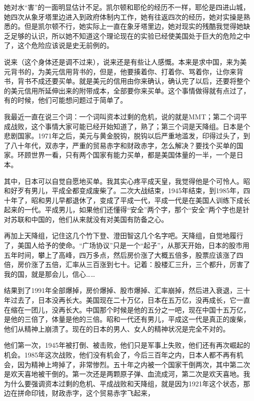 \documentclass[UTF8, 12pt, a4paper]{ctexrep}
\begin{document}
她对水“害”的一面明显估计不足。凯尔顿和耶伦的经历不一样，耶伦是四进山城，她四次从象牙塔里边进入到政府体制内工作，她有往返四次的经历，她对实操是熟悉的。但是凯尔顿不行，她实际上一直在象牙塔里边，她对现实的残酷我觉得她缺乏足够的认识，所以她不知道这个理论现在的实验已经使美国处于巨大的危险之中了，这个危险应该说是史无前例的。

说来（这个身体还是调不过来），说来还是有些让人感慨。本来是求中国，来为美元背书的，为美元信用背书的，但是，他要揍着你、打着你、骂着你，让你来背书，背书不成还要买单。就是美元的信用由你来确认，确认完了以后，还要将整个的美元信用所延伸出来的附带成本，全部要你来买单。这个事情做得就有点过了，有的时候，他们可能想问题过于简单了。

我最近一直在说三个词：一个词叫资本过剩的危机，说的就是MMT；第二个词平成战败，这个事情大家可能已经开始知道了，熟了；第三个词是天降组。日本是个悲剧国家。1971年之后，美元与黄金脱钩，脱钩以后严重地滥发，印得过头了，到了八十年代，双赤字，严重的贸易赤字和财政赤字，怎么解决？要找个买单的国家。环顾世界一看，只有两个国家有能力买单，都是美国体量的一半，一个是日本。

其中，日本可以自觉自愿地买单。我其实心疼平成天皇，我觉得他是个可怜人。昭和好歹有男儿，平成全都变成废柴了。二次大战结束，1945年结束，到1985年，四十年了，昭和男儿早都退休了，变成了平成一代，平成一代是在美国人训练下成长起来的一代。平成男儿，如果他们还懂得“安全”两个字，那个“安全”两个字也是针对苏联和中国的，他们从来就没有对美国有防备之心。

再加上天降组，记住这几个竹下登、澄田智这几个名字吧。天降组，自觉地履行了，美国人给予的使命。“广场协议”只是一个“起子”，从那天开始，日本的股市用五年时间，攀上了高峰，四万多点，然后房价涨了大概五倍多，股票应该涨了四倍，房价涨了五倍，汇率从三百涨到七十。记着：股楼汇三升，三个都升，厉害了我的国，就是那会儿，信心……

结果到了1991年全部爆掉，房价爆掉、股市爆掉、汇率崩掉，然后进入衰退，三十年过去了，日本没再长大。美国现在二十万亿，日本在五万亿，没再成长，它一直在缩在一团儿，没再长大。中国那个时候是他的五分之一吧，现在中国十五万亿，是他的三倍了，体量是他的三倍。昭和一代还有男儿，平成这一代是真正的废柴，他们从精神上崩溃了。现在的日本的男人、女人的精神状况是完全不对的。

他们第一次，1945年被打倒、被击败，他们只是军事上失败，他们还有再次崛起的机会。1985年这次战败，他们没有机会了，今后三百年之内，日本人都不再有机会，因为精神上垮掉了，非常惨烈。五十年之内被一个国家干倒两次，其中第二次是欢天喜地被干倒的。第一次还是两颗原子弹、血流成河，第二次是欢天喜地。我为什么要强调资本过剩的危机、平成战败和天降组，就是因为1921年这个状态，那边在拼命印钱，财政赤字，这个贸易赤字飞起来，
\end{document}
